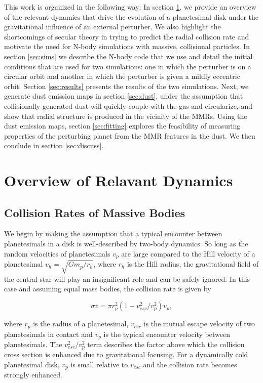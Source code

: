 \documentclass[onecolumn]{aastex63}
\begin{document}
This work is organized in the following way: In section \ref{sec:dynamics}, we provide an overview of the relevant dynamics that drive 
the evolution of a planetesimal disk under the gravitational influence of an external perturber. We also highlight the shortcomings of secular theory in trying to predict the radial collision rate and motivate the need for N-body simulations with massive, collisional particles. In section \ref{sec:sims} we describe the N-body code that we use and detail the initial conditions that are used for two simulations: one in which the perturber is on a circular orbit and another in which the perturber is given a mildly eccentric orbit. Section \ref{sec:results} presents the results of the two simulations. Next, we generate dust emission maps in section \ref{sec:dust}, under the assumption that collisionally-generated dust will quickly couple with the gas and circularize, and show that radial structure is produced in the vicinity of the MMRs. Using the dust emission maps, section \ref{sec:fitting} explores the feasibility of measuring properties of the perturbing planet from the MMR features in the dust. We then conclude in section \ref{sec:discuss}. 

\section{Overview of Relavant Dynamics} \label{sec:dynamics}

\subsection{Collision Rates of Massive Bodies}

We begin by making the assumption that a typical encounter between planetesimals in a disk is well-described by two-body 
dynamics. So long as the random velocities of planetesimals $v_{p}$ are large compared to the Hill velocity of a planetesimal $v_{h} 
= \sqrt{G m_{p} / r_{h}}$, where $r_{h}$ is the Hill radius, the gravitational field of the central star will play an insignificant role and 
can be safely ignored. In this case and assuming equal mass bodies, the collision rate is given by \citep{1967SvA....10..650S}

\begin{equation}\label{eq:safronov}
	\sigma v = \pi r_{p}^2 \left( 1 + v_{esc}^2/v_{p}^2 \right) v_{p},
\end{equation}

\noindent where $r_{p}$ is the radius of a planetesimal, $v_{esc}$ is the mutual escape velocity of two planetesimals in contact and 
$v_{p}$ is the typical encounter velocity between planetesimals. The $v_{esc}^2/v_{p}^2$ term describes the factor above which the 
collision cross section is enhanced due to gravitational focusing. For a dynamically cold planetesimal disk, $v_{p}$ is small relative to 
$v_{esc}$ and the collision rate becomes strongly enhanced.
\end{document}
